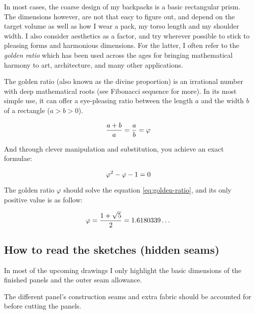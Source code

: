 In most cases, the coarse design of my backpacks is a basic rectangular prism. The dimensions however, are not that easy to figure out, and depend on the target volume as well as how I wear a pack, my torso length and my shoulder width. I also consider aesthetics as a factor, and try wherever possible to stick to pleasing forms and harmonious dimensions. For the latter, I often refer to the \textit{golden ratio} which has been used across the ages for bringing mathematical harmony to art, architecture, and many other applications.

\begin{note}
  The golden ratio (also known as the divine proportion) is an irrational number with deep mathematical roots (see Fibonacci sequence for more). In its most simple use, it can offer a eye-pleasing ratio between the length $a$ and the width $b$ of a rectangle ($a > b > 0$).

  \begin{equation}
    \centering
    \frac{a + b}{a} = \frac{a}{b}=\varphi
  \end{equation}

  And through clever manipulation and substitution, you achieve an exact formulae:

  \begin{equation}
    \centering
    \label{eq:golden-ratio}
    \varphi^2 - \varphi - 1 = 0
  \end{equation}

  The golden ratio $\varphi$ should solve the equation \ref{eq:golden-ratio}, and its only positive value is as follow:

  \begin{equation}
    \centering
    \varphi = \frac{1 + \sqrt{5}}{2} = 1.6180339\dots
  \end{equation}

\end{note}

\subsection{How to read the sketches (hidden seams)}

In most of the upcoming drawings I only highlight the basic dimensions of the finished panels and the outer seam allowance.

\begin{warning}
  The different panel's construction seams and extra fabric should be accounted for before cutting the panels.
\end{warning}

